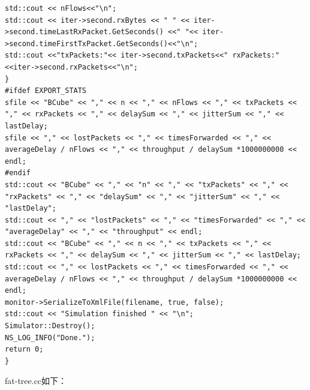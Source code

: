 \documentclass[lang=cn,11pt,a4paper,cite=authoryear]{elegantpaper}
\begin{document}
\begin{lstlisting}
std::cout << nFlows<<"\n";
std::cout << iter->second.rxBytes << " " << iter->second.timeLastRxPacket.GetSeconds() <<" "<< iter->second.timeFirstTxPacket.GetSeconds()<<"\n";
std::cout <<"txPackets:"<< iter->second.txPackets<<" rxPackets:"<<iter->second.rxPackets<<"\n";
}
#ifdef EXPORT_STATS
sfile << "BCube" << "," << n << "," << nFlows << "," << txPackets << "," << rxPackets << "," << delaySum << "," << jitterSum << "," << lastDelay;
sfile << "," << lostPackets << "," << timesForwarded << "," << averageDelay / nFlows << "," << throughput / delaySum *1000000000 << endl;
#endif
std::cout << "BCube" << "," << "n" << "," << "txPackets" << "," << "rxPackets" << "," << "delaySum" << "," << "jitterSum" << "," << "lastDelay";
std::cout << "," << "lostPackets" << "," << "timesForwarded" << "," << "averageDelay" << "," << "throughput" << endl;
std::cout << "BCube" << "," << n << "," << txPackets << "," << rxPackets << "," << delaySum << "," << jitterSum << "," << lastDelay;
std::cout << "," << lostPackets << "," << timesForwarded << "," << averageDelay / nFlows << "," << throughput / delaySum *1000000000 << endl;
monitor->SerializeToXmlFile(filename, true, false);
std::cout << "Simulation finished " << "\n";
Simulator::Destroy();
NS_LOG_INFO("Done.");
return 0;
}
\end{lstlisting}


fat-tree.cc如下：
\end{document}

